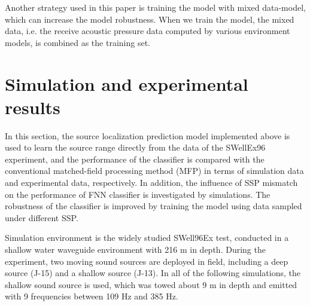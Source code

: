 Another strategy used in this paper is training the model with mixed data-model, which can increase the model robustness.
When we train the model, the mixed data, i.e. the receive acoustic pressure data computed by various environment models, is combined as the training set.

\section{Simulation and experimental results}
In this section, the source localization prediction model implemented above is used to learn the source range directly from the data of the SWellEx96 experiment, and the performance of the classifier is compared with the conventional matched-field processing method (MFP) in terms of simulation data and experimental data, respectively. In addition, the influence of SSP mismatch on the performance of FNN classifier is investigated by simulations. The robustness of the classifier is improved by training the model using data sampled under different SSP.

Simulation environment is the widely studied SWell96Ex test, conducted in a shallow water waveguide environment with 216 m in depth.
During the experiment, two moving sound sources are deployed in field, including a deep source (J-15) and a shallow source (J-13). In all of the following simulations, the shallow sound source is used, which was towed about 9 m in depth and emitted with 9 frequencies between 109 Hz and 385 Hz.

